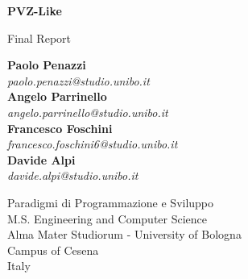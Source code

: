 \begin{titlepage}
    \begin{center}
        \vspace*{1cm}

        \huge
        \textbf{PVZ-Like}

        \vspace{0.5cm}

        \Large
        Final Report

        \vspace{4cm}

        \large
        \textbf{Paolo Penazzi} \\
        \textit{paolo.penazzi@studio.unibo.it} \\
        \textbf{Angelo Parrinello} \\
        \textit{angelo.parrinello@studio.unibo.it} \\
        \textbf{Francesco Foschini} \\
        \textit{francesco.foschini6@studio.unibo.it} \\
        \textbf{Davide Alpi} \\
        \textit{davide.alpi@studio.unibo.it} \\

        \vspace{4cm}

        \Large
        Paradigmi di Programmazione e Sviluppo\\
        M.S. Engineering and Computer Science\\
        Alma Mater Studiorum - University of Bologna\\
        Campus of Cesena\\
        Italy\\

    \end{center}
\end{titlepage}